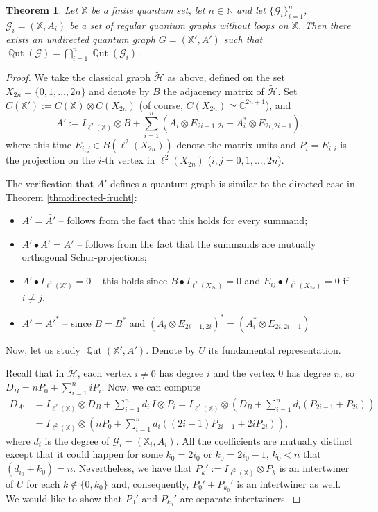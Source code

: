 \documentclass[12pt]{amsart}
\newtheorem{thm}{Theorem}[section]
\theoremstyle{definition}
\theoremstyle{definition}
\theoremstyle{definition}
\theoremstyle{definition}
\DeclareMathOperator{\Qut}{\mathbb{Q}ut}
\newcommand{\I}{{I}}
\newcommand{\X}{\mathbb{X}}
\newcommand{\C}{\mathbb{C}}
\newcommand{\N}{\mathbb{N}}
\newcommand{\Gr}{\mathcal{G}}
\newcommand{\Hr}{\mathcal{H}}
\numberwithin{equation}{section}
\begin{document}
\begin{thm}
\label{T.q22}
    Let $\X$ be a finite quantum set, let $n \in \N$ and let $\{\Gr_i\}_{i=1}^n$, $\Gr_i=(\X,A_i)$ be a set of regular quantum graphs without loops on $\X$. Then there exists an undirected  quantum graph $G=(\X',A')$ such that $\Qut (\Gr)=\bigcap_{i=1}^n\Qut(\Gr_i)$.
\end{thm}
\begin{proof}
We take the classical graph $\tilde{\Hr}$ as above, defined on the set $X_{2n} = \{0,1,\ldots, 2n\}$ and denote by $B$ the adjacency matrix of $\tilde{\Hr}$. Set $C(\X'):=C(\X)\otimes C(X_{2n})$ (of course, $C(X_{2n})\simeq\C^{2n+1}$), and
$$A':=\I_{\ell^2(\X)}\otimes B+\sum_{i=1}^n (A_i\otimes E_{2i-1,2i}+A_i^*\otimes E_{2i,2i-1}),$$
where this time  $E_{i,j} \in B(\ell^2(X_{2n}))$ denote the matrix units and $P_i = E_{i,i}$ is the projection on the $i$-th vertex in $\ell^2(X_{2n})$ ($i,j=0,1,\ldots, 2n$).

The verification that $A'$ defines a quantum graph is similar to the directed case in Theorem \ref{thm:directed-frucht}: 
\begin{itemize}
\item $A'=\bar{A'}$ -- follows from the fact that this holds for every summand;
\item $A'\bullet A'=A'$ -- follows from the fact that the summands are mutually orthogonal Schur-projections;
\item $A'\bullet \I_{\ell^2(\X')}=0$ -- this holds since $B\bullet \I_{\ell^2(X_{2n})}=0$ and $E_{ij}\bullet \I_{\ell^2(X_{2n})}=0$ if $i\neq j$.
\item $A'=A'^*$ -- since $B=B^*$ and $(A_i\otimes E_{2i-1,2i})^*=(A_i^*\otimes E_{2i,2i-1})$
\end{itemize}

Now, let us study $\Qut(\X', A')$. Denote by $U$ its fundamental representation.

Recall that in $\tilde{\Hr}$, each vertex $i\neq 0$ has degree $i$ and the vertex 0 has degree $n$, so $D_B=n P_0+\sum_{i=1}^n iP_i$. Now, we can compute
\begin{align*}
D_{A'}&=\I_{\ell^2(\X)}\otimes D_B+\sum_{i=1}^n d_i\,\I\otimes P_i=\I_{\ell^2(\X)}\otimes\left(D_B+\sum_{i=1}^{n} d_i(P_{2i-1}+P_{2i})\right)\\
&=\I_{\ell^2(\X)}\otimes\left(n P_0+\sum_{i=1}^n d_i((2i-1)P_{2i-1}+2iP_{2i})\right),
\end{align*}
where $d_i$ is the degree of $\Gr_i=(\X_i,A_i)$. All the coefficients are mutually distinct except that it could happen for some $k_0=2i_0$ or $k_0=2i_0-1$, $k_0<n$ that $(d_{i_0}+k_0)=n$. Nevertheless, we have that $P_k':=\I_{\ell^2(\X)}\otimes P_k$ is an intertwiner of $U$ for each $k\notin \{0,k_0\}$ and, consequently, $P_0'+P_{k_0}'$ is an intertwiner as well. We would like to show that $P_0'$ and $P_{k_0}'$ are separate intertwiners.


\end{proof}
\end{document}
